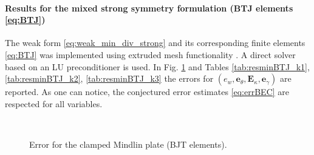\paragraph{Results for the mixed strong symmetry formulation (BTJ elements \eqref{eq:BTJ})} 

The weak form \eqref{eq:weak_min_div_strong} and its corresponding finite elements \eqref{eq:BTJ} was implemented using {} extruded mesh functionality \cite{mcrae2016}. A direct solver based on an LU preconditioner is used. In Fig. \ref{fig:errorBTJ} and Tables \ref{tab:resminBTJ_k1}, \ref{tab:resminBTJ_k2}, \ref{tab:resminBTJ_k3} the errors for $(e_w, \bm{e}_\theta, \bm{E}_\kappa, \bm{e}_\gamma)$ are reported. As one can notice, the conjectured error estimates \eqref{eq:errBEC} are respected for all variables. 

\begin{figure}[htbp]%
	\centering
	\hspace{8pt}%
	 \\
	\hspace{8pt}%
	\caption{Error for the clamped Mindlin plate (BJT elements).}%
	\label{fig:errorBTJ}%
\end{figure}



